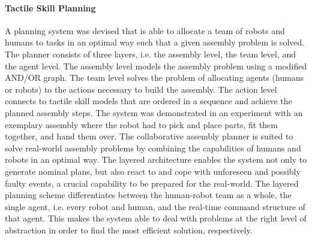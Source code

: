 \paragraph{Tactile Skill Planning}
A planning system was devised that is able to allocate a team of robots and humans to tasks in an optimal way such that a given assembly problem is solved.
The planner consists of three layers, i.e. the assembly level, the team level, and the agent level.
The assembly level models the assembly problem using a modified AND/OR graph.
The team level solves the problem of allocating agents (humans or robots) to the actions necessary to build the assembly.
The action level connects to tactile skill models that are ordered in a sequence and achieve the planned assembly steps.
The system was demonstrated in an experiment with an exemplary assembly where the robot had to pick and place parts, fit them together, and hand them over.
The collaborative assembly planner is suited to solve real-world assembly problems by combining the capabilities of humans and robots in an optimal way.
The layered architecture enables the system not only to generate nominal plans, but also react to and cope with unforeseen and possibly faulty events, a crucial capability to be prepared for the real-world.
The layered planning scheme differentiates between the human-robot team as a whole, the single agent, i.e. every robot and human, and the real-time command structure of that agent. This makes the system able to deal with problems at the right level of abstraction in order to find the most efficient solution, respectively.
